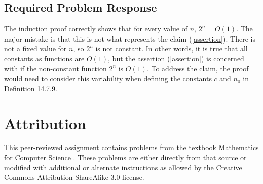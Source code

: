 \documentclass[fleqn,10pt]{olplainarticle}
\begin{document}
        \subsection*{Required Problem Response}
            
            The induction proof correctly shows that for every value of $n$, $2^n = O(1)$. The major mistake is that this is not what represents the claim (\ref{assertion}). There is not a fixed value for $n$, so $2^n$ is not constant. In other words, it is true that all constants as functions are $O(1)$, but the assertion (\ref{assertion}) is concerned with if the non-constant function $2^n$ is $O(1)$. To address the claim, the proof would need to consider this variability when defining the constants $c$ and $n_0$ in Definition 14.7.9.
        
           
    \vspace{4 em}
    
    \section*{Attribution}
        This peer-reviewed assignment contains problems from the textbook Mathematics for Computer Science \cite{MIT}. These problems are either directly from that source or modified with additional or alternate instructions as allowed by the Creative Commons Attribution-ShareAlike 3.0 license. 
        
    \printbibliography
\end{document}
